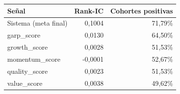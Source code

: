 \begin{tabular}{lrr}
\toprule
Señal & Rank-IC & Cohortes positivas \\
\midrule
Sistema (meta final) & 0,1004 & 71,79\% \\
garp\_score & 0,0130 & 64,50\% \\
growth\_score & 0,0028 & 51,53\% \\
momentum\_score & -0,0001 & 52,67\% \\
quality\_score & 0,0023 & 51,53\% \\
value\_score & 0,0038 & 49,62\% \\
\bottomrule
\end{tabular}
